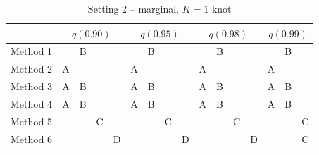 \documentclass[useAMS,usenatbib,referee]{biomweb}
\begin{document}

\begin{table}[htbp]
  \centering
  \caption{Setting 2 -- \Skewt marginal, $K = 1$ knot}
  \label{sttbl:st1sim}
  \begin{tabular}{|l|cccc|cccc|cccc|ccc|}
    \cline{2-16}
    \multicolumn{1}{c}{} & \multicolumn{4}{|c}{$q(0.90)$} & \multicolumn{4}{|c}{$q(0.95)$} & \multicolumn{4}{|c}{$q(0.98)$} & \multicolumn{3}{|c|}{$q(0.99)$} \\
    \hline
    Method 1 &   & B &   &   &   & B &   &   &   & B &   &   &   & B &   \\
    \hline
    Method 2 & A &   &   &   & A &   &   &   & A &   &   &   & A &   &   \\
    \hline
    Method 3 & A & B &   &   & A & B &   &   & A & B &   &   & A & B &   \\
    \hline
    Method 4 & A & B &   &   & A & B &   &   & A & B &   &   & A & B &   \\
    \hline
    Method 5 &   &   & C &   &   &   & C &   &   &   & C &   &   &   & C \\
    \hline
    Method 6 &   &   &   & D &   &   &   & D &   &   &   & D &   &   & C \\
    \hline
  \end{tabular}
\end{table}
\end{document}
